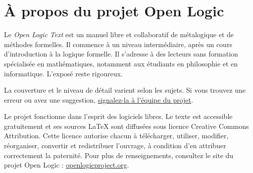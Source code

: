 \chapter*{À propos du projet Open Logic}

Le \textit{Open Logic Text} est un manuel libre et collaboratif de
métalogique et de méthodes formelles. Il commence à un niveau
intermédiaire, après un cours d'introduction à la logique formelle.
Il s'adresse à des lecteurs sans formation spécialisée en
mathématiques, notamment aux étudiants en philosophie et en
informatique. L'exposé reste rigoureux.

La couverture et le niveau de détail varient selon les sujets.
Si vous trouvez une erreur ou avez une suggestion,
\href{https://github.com/OpenLogicProject/OpenLogic/wiki/Contributing}{signalez-la
à l'équipe du projet}.

Le projet fonctionne dans l'esprit des logiciels libres. Le texte
est accessible gratuitement et ses sources LaTeX sont diffusées sous
licence Creative Commons Attribution. Cette licence autorise chacun à
télécharger, utiliser, modifier, réorganiser, convertir et redistribuer
l'ouvrage, à condition d'en attribuer correctement la paternité.
Pour plus de renseignements, consultez le site du projet Open Logic :
\href{http://openlogicproject.org/}{openlogicproject.org}.
